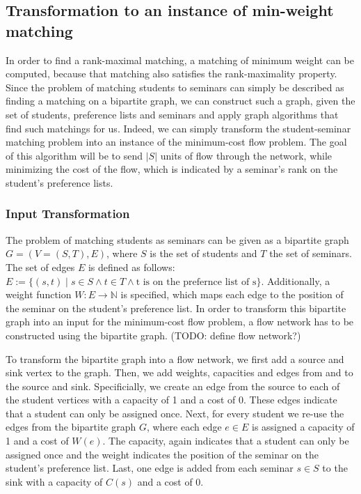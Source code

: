 \subsection{Transformation to an instance of min-weight matching}
In order to find a rank-maximal matching, a matching of minimum weight can be computed, because that matching also satisfies the rank-maximality property. Since the problem of matching students to seminars can simply be described as finding a matching on a bipartite graph, we can construct such a graph, given the set of students, preference lists and seminars and apply graph algorithms that find such matchings for us. 
\newline
Indeed, we can simply transform the student-seminar matching problem into an instance of the minimum-cost flow problem. The goal of this algorithm will be to send $|S|$ units of flow through the network, while minimizing the cost of the flow, which is indicated by a seminar's rank on the student's preference lists.

\subsubsection{Input Transformation}
The problem of matching students as seminars can be given as a bipartite graph $G=(V=(S, T), E)$, where $S$ is the set of students and $T$ the set of seminars. The set of edges $E$ is defined as follows: $E:= \{(s, t) \mid s \in S \land t \in T \land \mbox{t is on the prefernce list of s}\}$. Additionally, a weight function $W: E \rightarrow  \mathbb{N}$ is specified, which maps each edge to the position of the seminar on the student's preference list. In order to transform this bipartite graph into an input for the minimum-cost flow problem, a flow network has to be constructed using the bipartite graph. (TODO: define flow network?) 

To transform the bipartite graph into a flow network, we first add a source and sink vertex to the graph. Then, we add weights, capacities and edges from and to the source and sink. Specificially, we create an edge from the source to each of the student vertices with a capacity of 1 and a cost of 0. These edges indicate that a student can only be assigned once. Next, for every student we re-use the edges from the bipartite graph $G$, where each edge $e \in E$ is assigned a capacity of 1 and a cost of $W(e)$. The capacity, again indicates that a student can only be assigned once and the weight indicates the position of the seminar on the student's preference list. Last, one edge is added from each seminar $s \in S$ to the sink with a capacity of $C(s)$ and a cost of 0. 

